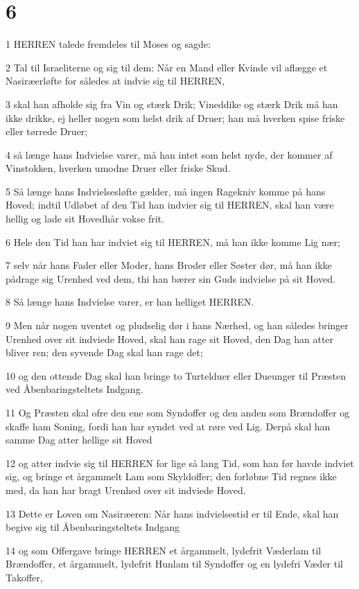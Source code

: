 \chapter{6}

\par 1 HERREN talede fremdeles til Moses og sagde:
\par 2 Tal til Israeliterne og sig til dem: Når en Mand eller Kvinde vil aflægge et Nasiræerløfte for således at indvie sig til HERREN,
\par 3 skal han afholde sig fra Vin og stærk Drik; Vineddike og stærk Drik må han ikke drikke, ej heller nogen som helst drik af Druer; han må hverken spise friske eller tørrede Druer;
\par 4 så længe hans Indvielse varer, må han intet som helst nyde, der kommer af Vinstokken, hverken umodne Druer eller friske Skud.
\par 5 Så længe hans Indvielsesløfte gælder, må ingen Ragekniv komme på hans Hoved; indtil Udløbet af den Tid han indvier sig til HERREN, skal han være hellig og lade sit Hovedhår vokse frit.
\par 6 Hele den Tid han har indviet sig til HERREN, må han ikke komme Lig nær;
\par 7 selv når hans Fader eller Moder, hans Broder eller Søster dør, må han ikke pådrage sig Urenhed ved dem, thi han bærer sin Guds indvielse på sit Hoved.
\par 8 Så længe hans Indvielse varer, er han helliget HERREN.
\par 9 Men når nogen uventet og pludselig dør i hans Nærhed, og han således bringer Urenhed over sit indviede Hoved, skal han rage sit Hoved, den Dag han atter bliver ren; den syvende Dag skal han rage det;
\par 10 og den ottende Dag skal han bringe to Turtelduer eller Dueunger til Præsten ved Åbenbaringsteltets Indgang.
\par 11 Og Præsten skal ofre den ene som Syndoffer og den anden som Brændoffer og skaffe ham Soning, fordi han har syndet ved at røre ved Lig. Derpå skal han samme Dag atter hellige sit Hoved
\par 12 og atter indvie sig til HERREN for lige så lang Tid, som han før havde indviet sig, og bringe et årgammelt Lam som Skyldoffer; den forløbne Tid regnes ikke med, da han har bragt Urenhed over sit indviede Hoved.
\par 13 Dette er Loven om Nasiræeren: Når hans indvielsestid er til Ende, skal han begive sig til Åbenbaringsteltets Indgang
\par 14 og som Offergave bringe HERREN et årgammelt, lydefrit Væderlam til Brændoffer, et årgammelt, lydefrit Hunlam til Syndoffer og en lydefri Væder til Takoffer,

